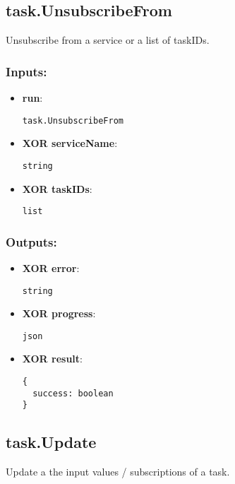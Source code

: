 \subsection{task.UnsubscribeFrom}
\label{ch:builtinservices:task.UnsubscribeFrom}
Unsubscribe from a service or a list of taskIDs.
\subsubsection*{Inputs:}
\begin{itemize}
  \small
    \item \textbf{run}: 
\begin{lstlisting}
task.UnsubscribeFrom
\end{lstlisting}
    \item \textbf{XOR serviceName}: 
\begin{lstlisting}
string
\end{lstlisting}
    \item \textbf{XOR taskIDs}: 
\begin{lstlisting}
list
\end{lstlisting}
  \end{itemize}
\subsubsection*{Outputs:}
\begin{itemize}
  \small
    \item \textbf{XOR error}: 
\begin{lstlisting}
string
\end{lstlisting}
    \item \textbf{XOR progress}: 
\begin{lstlisting}
json
\end{lstlisting}
    \item \textbf{XOR result}: 
\begin{lstlisting}
{
  success: boolean
}
\end{lstlisting}
  \end{itemize}

\subsection{task.Update}
\label{ch:builtinservices:task.Update}
Update a the input values / subscriptions of a task.
